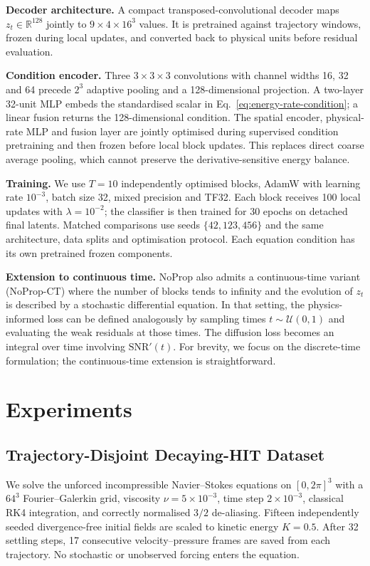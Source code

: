 \documentclass[preprint,12pt]{elsarticle}
\begin{document}
\textbf{Decoder architecture.} A compact transposed-convolutional decoder maps
$z_t\in\mathbb{R}^{128}$ jointly to $9\times4\times16^3$ values. It is
pretrained against trajectory windows, frozen during local updates, and
converted back to physical units before residual evaluation.

\textbf{Condition encoder.} Three $3\times3\times3$ convolutions with channel
widths 16, 32 and 64 precede $2^3$ adaptive pooling and a 128-dimensional
projection. A two-layer 32-unit MLP embeds the standardised scalar in
Eq.~\eqref{eq:energy-rate-condition}; a linear fusion returns the
128-dimensional condition. The spatial encoder, physical-rate MLP and fusion
layer are jointly optimised during supervised condition pretraining and then
frozen before local block updates. This replaces direct coarse average pooling,
which cannot preserve the derivative-sensitive energy balance.

\textbf{Training.} We use $T=10$ independently optimised blocks, AdamW with
learning rate $10^{-3}$, batch size 32, mixed precision and TF32. Each block
receives 100 local updates with $\lambda=10^{-2}$; the classifier is then
trained for 30 epochs on detached final latents. Matched comparisons use seeds
$\{42,123,456\}$ and the same architecture, data splits and optimisation
protocol. Each equation condition has its own pretrained frozen components.

\textbf{Extension to continuous time.} NoProp also admits a continuous-time variant (NoProp-CT) \cite{li2025noprop} where the number of blocks tends to infinity and the evolution of $z_t$ is described by a stochastic differential equation. In that setting, the physics-informed loss can be defined analogously by sampling times $t\sim\mathcal{U}(0,1)$ and evaluating the weak residuals at those times. The diffusion loss becomes an integral over time involving $\mathrm{SNR}'(t)$. For brevity, we focus on the discrete-time formulation; the continuous-time extension is straightforward.
\section{Experiments}
\label{sec:experiments}

\subsection{Trajectory-Disjoint Decaying-HIT Dataset}
\label{sec:dataset}

We solve the unforced incompressible Navier--Stokes equations on
$[0,2\pi]^3$ with a $64^3$ Fourier--Galerkin grid, viscosity
$\nu=5\times10^{-3}$, time step $2\times10^{-3}$, classical RK4 integration,
and correctly normalised $3/2$ de-aliasing. Fifteen independently seeded
divergence-free initial fields are scaled to kinetic energy $K=0.5$. After 32
settling steps, 17 consecutive velocity--pressure frames are saved from each
trajectory. No stochastic or unobserved forcing enters the equation.
\end{document}
